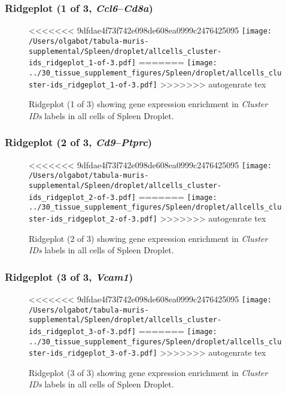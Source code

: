 \clearpage

\subsubsection{Ridgeplot (1 of 3, \emph{Ccl6}--\emph{Cd8a})}
\begin{figure}[h]
\centering
<<<<<<< 9dfdae4f73f742e098de608ea0999c2476425095
\texttt{[image: /Users/olgabot/tabula-muris-supplemental/Spleen/droplet/allcells\_cluster-ids\_ridgeplot\_1-of-3.pdf]}
=======
\texttt{[image: ../30\_tissue\_supplement\_figures/Spleen/droplet/allcells\_cluster-ids\_ridgeplot\_1-of-3.pdf]}
>>>>>>> autogenrate tex

\caption{ Ridgeplot (1 of 3)  showing gene expression enrichment in \emph{Cluster IDs} labels in all cells of Spleen Droplet. }
\end{figure}


\clearpage

\subsubsection{Ridgeplot (2 of 3, \emph{Cd9}--\emph{Ptprc})}
\begin{figure}[h]
\centering
<<<<<<< 9dfdae4f73f742e098de608ea0999c2476425095
\texttt{[image: /Users/olgabot/tabula-muris-supplemental/Spleen/droplet/allcells\_cluster-ids\_ridgeplot\_2-of-3.pdf]}
=======
\texttt{[image: ../30\_tissue\_supplement\_figures/Spleen/droplet/allcells\_cluster-ids\_ridgeplot\_2-of-3.pdf]}
>>>>>>> autogenrate tex

\caption{ Ridgeplot (2 of 3)  showing gene expression enrichment in \emph{Cluster IDs} labels in all cells of Spleen Droplet. }
\end{figure}


\clearpage

\subsubsection{Ridgeplot (3 of 3, \emph{Vcam1})}
\begin{figure}[h]
\centering
<<<<<<< 9dfdae4f73f742e098de608ea0999c2476425095
\texttt{[image: /Users/olgabot/tabula-muris-supplemental/Spleen/droplet/allcells\_cluster-ids\_ridgeplot\_3-of-3.pdf]}
=======
\texttt{[image: ../30\_tissue\_supplement\_figures/Spleen/droplet/allcells\_cluster-ids\_ridgeplot\_3-of-3.pdf]}
>>>>>>> autogenrate tex

\caption{ Ridgeplot (3 of 3)  showing gene expression enrichment in \emph{Cluster IDs} labels in all cells of Spleen Droplet. }
\end{figure}


